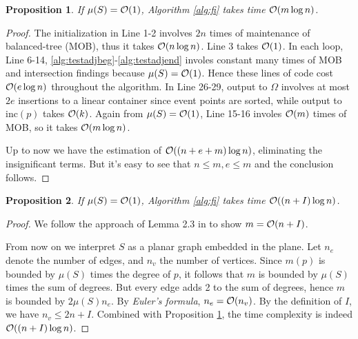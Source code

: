 \documentclass[a4paper]{article}
\newtheorem{prop}{Proposition}
\begin{document}
\begin{prop}
  If $\mu(S) = \mathcal{O}(1)$,
  Algorithm \ref{alg:fi} takes time $\mathcal{O}(m \log n)$.
  \label{prop:tcw}
\end{prop}
\begin{proof}

  The initialization in Line 1-2 involves $2n$ times of
    maintenance of balanced-tree (MOB),
    thus it takes $\mathcal{O}(n\log n)$. Line 3 takes $\mathcal{O}(1)$.
    In each loop, Line 6-14,
    \ref{alg:testadjbeg}-\ref{alg:testadjend} involes
    constant many times of MOB and intersection findings
    because $\mu(S) = \mathcal{O}(1)$.
    Hence these lines of code cost $\mathcal{O}(e \log n)$ throughout the algorithm.
    In Line 26-29, output to $\Omega$ involves
    at most $2e$ insertions to a linear container
    since event points are sorted, 
    while output to $\text{inc}(p)$ takes $\mathcal{O}(k)$.
    Again from $\mu(S) = \mathcal{O}(1)$,
    Line 15-16 involes $\mathcal{O}(m)$ times of MOB,
    so it takes $\mathcal{O}(m \log n)$.


    Up to now we have the estimation of $\mathcal{O}((n+e+m) \log n)$,
    eliminating the insignificant terms.
    But it's easy to see that $n \le m, e \le m$ and the conclusion follows.

\end{proof}

\begin{prop}
  If $\mu(S) = \mathcal{O}(1)$,
  Algorithm \ref{alg:fi} takes time $\mathcal{O}((n+I) \log n)$.
  \label{prop:tc}
\end{prop}
\begin{proof}
  We follow the approach of Lemma 2.3 in \cite{CG} to show $m=\mathcal{O}(n+I)$.
  
  From now on we interpret $S$ as a planar graph embedded in the plane.
  Let $n_e$ denote the number of edges, and $n_v$ the number of vertices.
  Since $m(p)$ is bounded by $\mu(S)$ times the degree of $p$,
  it follows that $m$ is bounded by $\mu(S)$ times the sum of degrees.
  But every edge adds 2 to the sum of degrees, 
  hence $m$ is bounded by $2 \mu(S) n_e$.
  By \emph{Euler's formula}, $n_e = \mathcal{O}(n_v)$.
%
  By the definition of $I$, we have $n_v \le 2n + I$. 
  Combined with Proposition \ref{prop:tcw}, 
  the time complexity is indeed $\mathcal{O}((n+I) \log n)$.
\end{proof}
\end{document}
